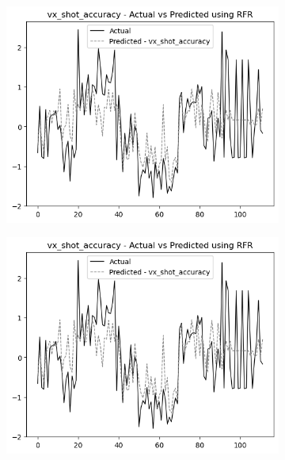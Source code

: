 \begin{figure}
    \centering
    \begin{subfigure}[b]{0.49\textwidth}
        \centering
        \includegraphics[width=\linewidth]{images/all_data_visual_shot_accuracy.png}
    \end{subfigure}\hfill
    \begin{subfigure}[b]{0.49\textwidth}
        \centering
        \includegraphics[width=\linewidth]{images/all_data_visual_shot_accuracy.png}
    \end{subfigure}
    

\end{figure}
